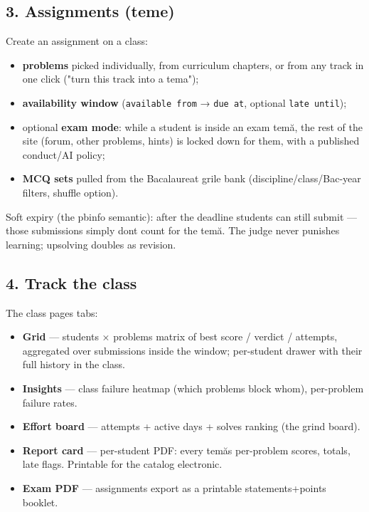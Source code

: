 \documentclass[
]{article}
\providecommand{\tightlist}{%
  \setlength{\itemsep}{0pt}\setlength{\parskip}{0pt}}
\begin{document}
\subsection{3. Assignments (teme)}\label{3-assignments-teme}

Create an assignment on a class:

\begin{itemize}
\tightlist
\item
  \textbf{problems} picked individually, from curriculum chapters, or
  from any track in one click ("turn this track into a tema");
\item
  \textbf{availability window} (\texttt{available\ from} →
  \texttt{due\ at}, optional \texttt{late\ until});
\item
  optional \textbf{exam mode}: while a student is inside an exam temă,
  the rest of the site (forum, other problems, hints) is locked down for
  them, with a published conduct/AI policy;
\item
  \textbf{MCQ sets} pulled from the Bacalaureat grile bank
  (discipline/class/Bac-year filters, shuffle option).
\end{itemize}

Soft expiry (the pbinfo semantic): after the deadline students can still
submit --- those submissions simply don\textquotesingle t count for the
temă. The judge never punishes learning; upsolving doubles as revision.

\subsection{4. Track the class}\label{4-track-the-class}

The class page\textquotesingle s tabs:

\begin{itemize}
\tightlist
\item
  \textbf{Grid} --- students × problems matrix of best score / verdict /
  attempts, aggregated over submissions inside the window; per-student
  drawer with their full history in the class.
\item
  \textbf{Insights} --- class failure heatmap (which problems block
  whom), per-problem failure rates.
\item
  \textbf{Effort board} --- attempts + active days + solves ranking (the
  grind board).
\item
  \textbf{Report card} --- per-student PDF: every temă\textquotesingle s
  per-problem scores, totals, late flags. Printable for the catalog
  electronic.
\item
  \textbf{Exam PDF} --- assignments export as a printable
  statements+points booklet.
\end{itemize}
\end{document}
